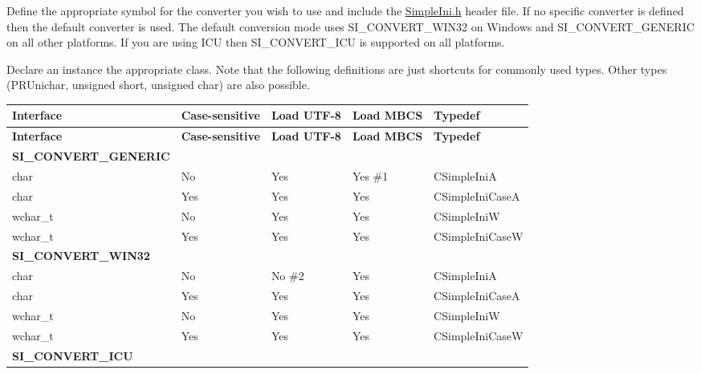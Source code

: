 \begin{DoxyEnumerate}
\item Define the appropriate symbol for the converter you wish to use and include the \hyperlink{a00473_source}{Simple\+Ini.\+h} header file. If no specific converter is defined then the default converter is used. The default conversion mode uses S\+I\+\_\+\+C\+O\+N\+V\+E\+R\+T\+\_\+\+W\+I\+N32 on Windows and S\+I\+\_\+\+C\+O\+N\+V\+E\+R\+T\+\_\+\+G\+E\+N\+E\+R\+IC on all other platforms. If you are using I\+CU then S\+I\+\_\+\+C\+O\+N\+V\+E\+R\+T\+\_\+\+I\+CU is supported on all platforms.
\item Declare an instance the appropriate class. Note that the following definitions are just shortcuts for commonly used types. Other types (P\+R\+Unichar, unsigned short, unsigned char) are also possible. \tabulinesep=1mm
\begin{longtabu} spread 0pt [c]{*{5}{|X[-1]}|}
\hline
\rowcolor{\tableheadbgcolor}\textbf{ Interface }&\textbf{ Case-\/sensitive }&\textbf{ Load U\+T\+F-\/8 }&\textbf{ Load M\+B\+CS }&\textbf{ Typedef }\\
\endfirsthead
\hline
\endfoot
\hline
\rowcolor{\tableheadbgcolor}\textbf{ Interface }&\textbf{ Case-\/sensitive }&\textbf{ Load U\+T\+F-\/8 }&\textbf{ Load M\+B\+CS }&\textbf{ Typedef }\\
\endhead
\rowcolor{\tableheadbgcolor}\textbf{ S\+I\+\_\+\+C\+O\+N\+V\+E\+R\+T\+\_\+\+G\+E\+N\+E\+R\+IC }\\
char &No &Yes &Yes \#1 &C\+Simple\+IniA \\
char &Yes &Yes &Yes &C\+Simple\+Ini\+CaseA \\
wchar\+\_\+t &No &Yes &Yes &C\+Simple\+IniW \\
wchar\+\_\+t &Yes &Yes &Yes &C\+Simple\+Ini\+CaseW \\
\rowcolor{\tableheadbgcolor}\textbf{ S\+I\+\_\+\+C\+O\+N\+V\+E\+R\+T\+\_\+\+W\+I\+N32 }\\
char &No &No \#2 &Yes &C\+Simple\+IniA \\
char &Yes &Yes &Yes &C\+Simple\+Ini\+CaseA \\
wchar\+\_\+t &No &Yes &Yes &C\+Simple\+IniW \\
wchar\+\_\+t &Yes &Yes &Yes &C\+Simple\+Ini\+CaseW \\
\rowcolor{\tableheadbgcolor}\textbf{ S\+I\+\_\+\+C\+O\+N\+V\+E\+R\+T\+\_\+\+I\+CU }\\

\end{longtabu}
\end{DoxyEnumerate}
